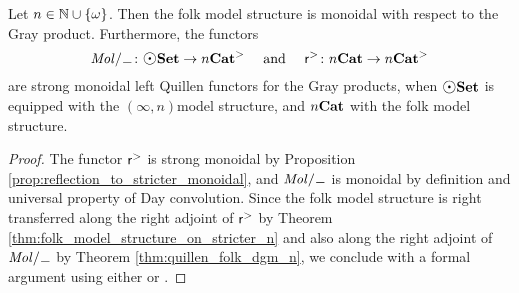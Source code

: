 \begin{prop} \label{prop:Gray_monoidal}
    Let \( n \in \mathbb{N} \cup \left\{ {\omega} \right\} \).
    Then the folk model structure is monoidal with respect to the Gray product.
    Furthermore, the functors 
    \begin{equation*}
         \molecin{-} \colon \dgmSet \to \snCat{n} \quad\text{ and }\quad \rcs \colon \nCat{n} \to \snCat{n}
    \end{equation*}
    are strong monoidal left Quillen functors for the Gray products, when \( \dgmSet \) is equipped with the \( (\infty, n) \)\nbd model structure, and \( {n\mathbf{Cat}} \) with the folk model structure.
\end{prop}
\begin{proof}
    The functor \( \mathsf{r}^{>} \) is strong monoidal by Proposition \ref{prop:reflection_to_stricter_monoidal}, and \( \molecin{-} \) is monoidal by definition and universal property of Day convolution.
    Since the folk model structure is right transferred along the right adjoint of \( \mathsf{r}^{>} \) by Theorem \ref{thm:folk_model_structure_on_stricter_n} and also along the right adjoint of \( \molecin{-} \) by Theorem \ref{thm:quillen_folk_dgm_n}, we conclude with a formal argument using either \cite[Theorem 5.6]{ara2020monoidal} or \cite[Theorem 5.10]{chanavat2025gray}.
\end{proof}
